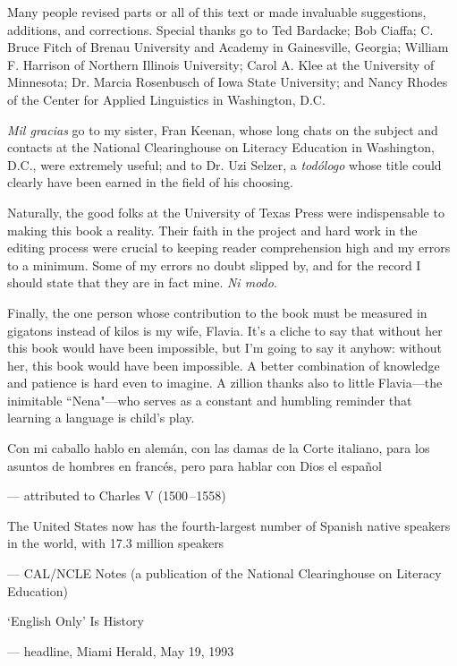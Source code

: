 Many people revised parts or all of this text or made invaluable suggestions, additions, and corrections. Special thanks go to
Ted Bardacke; Bob Ciaffa; C. Bruce Fitch of Brenau University and
Academy in Gainesville, Georgia; William F. Harrison of Northern
Illinois University; Carol A. Klee at the University of Minnesota;
Dr. Marcia Rosenbusch of Iowa State University; and Nancy Rhodes
of the Center for Applied Linguistics in Washington, D.C.

\emph{Mil gracias} go to my sister, Fran Keenan, whose long chats on
the subject and contacts at the National Clearinghouse on Literacy
Education in Washington, D.C., were extremely useful; and to Dr. Uzi
Selzer, a \emph{todólogo} whose title could clearly have been earned in the
field of his choosing.

Naturally, the good folks at the University of Texas Press were
indispensable to making this book a reality. Their faith in the project
and hard work in the editing process were crucial to keeping reader
comprehension high and my errors to a minimum. Some of my errors
no doubt slipped by, and for the record I should state that they are in
fact mine. \emph{Ni modo}.

Finally, the one person whose contribution to the book must
be measured in gigatons instead of kilos is my wife, Flavia. It's a cliche
to say that without her this book would have been impossible, but I'm
going to say it anyhow: without her, this book would have been impossible. A better combination of knowledge and patience is hard even to
imagine. A zillion thanks also to little Flavia---the inimitable ``Nena"---who serves as a constant and humbling reminder that learning a language is child's play.

\pagebreak
\thispagestyle{empty}
\vspace*{2in}

\epigraphfontsize{\normalsize\itshape}
\setlength\epigraphwidth{5in}
\setlength\epigraphrule{0pt}

\epigraph{Con mi caballo hablo en alemán,
	con las damas de la Corte italiano,
	para los asuntos de hombres en francés,
	pero para hablar con Dios el español}
{--- \textup{attributed
		to Charles V (1500\,--1558)}}

\epigraph{The United States now has the fourth-largest
	number of Spanish native speakers in the world,
	with 17.3 million speakers}
{--- \textup{CAL/NCLE Notes
		(a publication of the National Clearinghouse
		on Literacy Education)}}

\epigraph{`English Only'
	Is History}
{--- \textup{headline},
	Miami Herald,
	\textup{May 19, 1993}}

